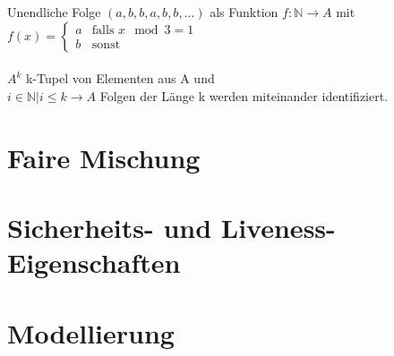 Unendliche Folge $ (a, b, b, a, b, b, ...) $ als Funktion $ f: \mathbb{N} \rightarrow A $ mit $ f(x) = \begin{cases} a & \text{falls } x \mod 3 = 1\\ b & \text{sonst}\end{cases} $\\
\\
$ A^k $ k-Tupel von Elementen aus A und \\
$ {i \in \mathbb{N} | i \leq k} \rightarrow A $ Folgen der Länge k werden miteinander identifiziert.

\section{Faire Mischung}

\section{Sicherheits- und Liveness-Eigenschaften}

\section{Modellierung}